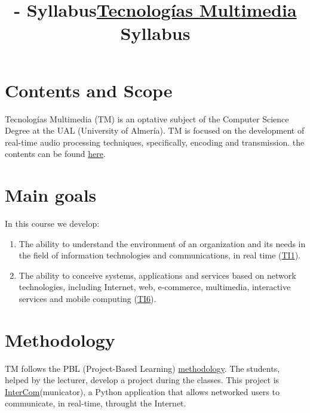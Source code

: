 

\title{\TM{} - Syllabus}
\title{\href{https://tecnologias-multimedia.github.io/}{Tecnologías Multimedia} \newline Syllabus}

\maketitle

\section{Contents and Scope}

Tecnologías Multimedia (TM) is an optative subject of the Computer
Science Degree at the UAL (University of Almería). TM is focused on
the development of real-time audio processing techniques,
specifically, encoding and transmission. the contents can be found
\href{https://tecnologias-multimedia.github.io/contents/}{here}.

\section{Main goals}

In this course we develop:
\begin{enumerate}
\item The ability to understand the environment of an organization and
  its needs in the field of information technologies and
  communications, in real time
  (\href{https://www.ual.es/application/files/8516/5061/5446/memoriavig-ing-informatica-4015.pdf}{TI1}).
\item The ability to conceive systems, applications and services based
  on network technologies, including Internet, web, e-commerce,
  multimedia, interactive services and mobile computing
  (\href{https://www.ual.es/application/files/8516/5061/5446/memoriavig-ing-informatica-4015.pdf}{TI6}).
\end{enumerate}

\section{Methodology}

TM follows the PBL (Project-Based Learning)
\href{http://portafirma.ual.es/pfirma/downloadReport/file?idDocument=4u61Ie5es2&idRequest=ZeBY35LlFa}{methodology}. The
students, helped by the lecturer, develop a project during the
classes. This project is
\href{https://github.com/Tecnologias-multimedia/intercom}{InterCom}(municator),
a Python application that allows networked users to communicate, in
real-time, throught the Internet.

